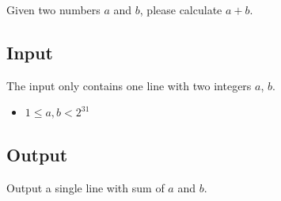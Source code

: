 
Given two numbers $a$ and $b$, please calculate $a+b$.

\subsection*{Input}

The input only contains one line with two integers $a$, $b$.

\begin{itemize}
    \item $1 \leq a, b < 2^{31}$
\end{itemize}

\subsection*{Output}

Output a single line with sum of $a$ and $b$.
